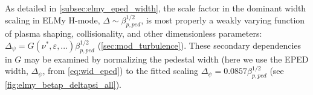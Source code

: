 As detailed in \cref{subsec:elmy_eped_width}, the scale factor in the dominant width scaling in ELMy H-mode, $\Delta \sim \beta_{p,ped}^{1/2}$, is most properly a weakly varying function of plasma shaping, collisionality, and other dimensionless parameters: $\Delta_\psi = G(\nu^*,\varepsilon,...) \beta_{p,ped}^{1/2}$ \cite{Snyder2011} (\cf \cref{sec:mod_turbulence}).  These secondary dependencies in $G$ may be examined by normalizing the pedestal width (here we use the EPED width, $\Delta_\psi$, from \cref{eq:wid_eped}) to the fitted scaling $\Delta_\psi = 0.0857 \beta_{p,ped}^{1/2}$ (see \cref{fig:elmy_betap_deltapsi_all}).  

\begin{figure}[p]
 \pushtooutside
\end{figure}

